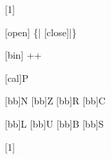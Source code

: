 [1]
  {}




\let\nothing\varnothing



\let\<\langle
\let\>\rangle

[open] {\{\!|}
[close]{|\!\}}



\let\lt<
\let\gt>

[bin]
  {+\!\!+}



[cal]{P}

  [bb]{N}
  [bb]{Z}
  [bb]{R}
  [bb]{C}

  [bb]{L}
  [bb]{U}
  [bb]{B}
[bb]{S}

\let\to\rightarrow
\let\implies\Rightarrow
\let\infers\vdash



[1]
  {\quad{}}



\newenvironment*{marginequation}[1][0pt]
  {\begin{marginfigure}[#1]\equation}
  {\endequation\end{marginfigure}}

\newenvironment*{marginequation*}[1][0pt]
  {\begin{marginfigure}[#1]\equation\nonumber}
  {\endequation\end{marginfigure}}

\newenvironment*{grammar}
  {\begin{block}\begin{tabular}{@{}rRCLl}}
  {\end{tabular}\end{block}}
